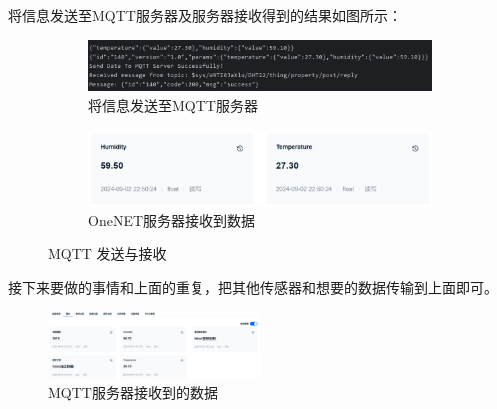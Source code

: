 将信息发送至MQTT服务器及服务器接收得到的结果如图所示：

\begin{figure} [H]  
    \centering
    \begin{subfigure}[t]{0.8\textwidth}
        \centering
        \includegraphics[width=\textwidth]{img/MQTTSendSuccess.png}  
        \caption{将信息发送至MQTT服务器}
        \label{fig:SendToMQTT}
    \end{subfigure}
    
    \vspace{1em}
    
    \begin{subfigure}[t]{0.6\textwidth}
        \centering
        \includegraphics[width=\textwidth]{img/MQTTGetData.png}  
        \caption{OneNET服务器接收到数据}
        \label{fig:OneNETGet}
    \end{subfigure}
    
    \caption{MQTT 发送与接收}
\end{figure}

接下来要做的事情和上面的重复，把其他传感器和想要的数据传输到上面即可。

\begin{figure} [H]
    \centering
    \includegraphics[width=0.5\textwidth]{img/MQTT_Data.png}
    \caption{MQTT服务器接收到的数据}
\end{figure}